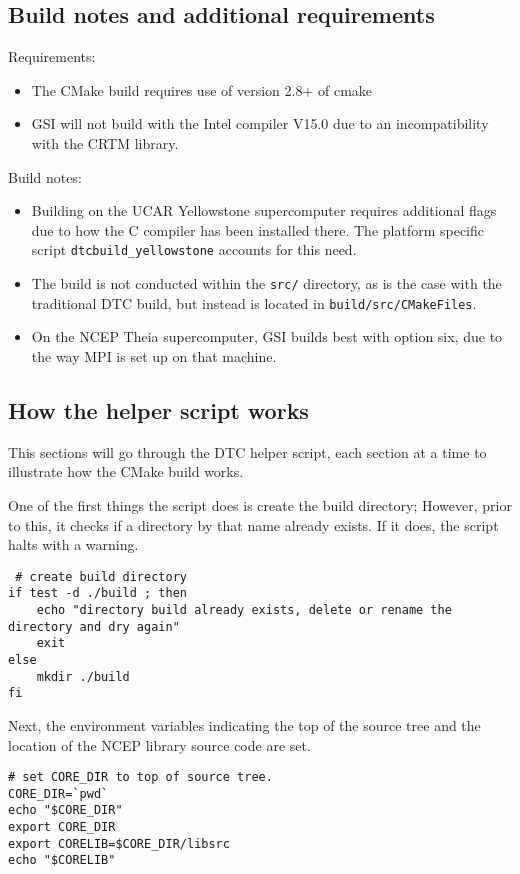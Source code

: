 \subsection{Build notes and additional requirements}
Requirements:
\begin{itemize}
\item The CMake build requires use of version 2.8+ of cmake
\item GSI will not build with the Intel compiler V15.0 due to an incompatibility with the CRTM library.  
\end{itemize}

Build notes:
\begin{itemize}
\item Building on the UCAR Yellowstone supercomputer requires additional flags due to how the C compiler has been installed there. The platform specific script \verb|dtcbuild_yellowstone| accounts for this need. 
\item The build is not conducted within the \verb|src/| directory, as is the case with the traditional DTC build, but instead is located in \verb|build/src/CMakeFiles|.
\item On the NCEP Theia supercomputer, GSI builds best with option six, due to the way MPI is set up on that machine.
\end{itemize}

\subsection{How the helper script works}
This sections will go through the DTC helper script, each section at a time to illustrate how the CMake build works. 
 
One of the first things the script does is create the build directory; However, prior to this, it checks if a directory by that name already exists. If it does, the script halts with a warning. 
\begin{small}
\begin{verbatim}
 # create build directory
if test -d ./build ; then
    echo "directory build already exists, delete or rename the directory and dry again"
    exit
else
    mkdir ./build
fi
\end{verbatim}
\end{small}

Next, the environment variables indicating the top of the source tree and the location of the NCEP library source code are set.  
\begin{small}
\begin{verbatim}
# set CORE_DIR to top of source tree.
CORE_DIR=`pwd`
echo "$CORE_DIR"
export CORE_DIR
export CORELIB=$CORE_DIR/libsrc
echo "$CORELIB"
\end{verbatim}
\end{small}

